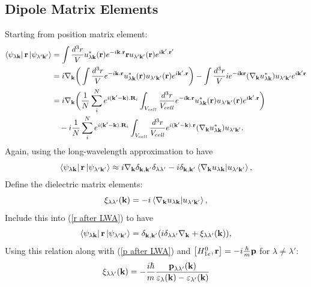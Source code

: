 \documentclass[12pt,english,a4paper]{article}
\begin{document}
\begin{appendices}
\section{Dipole Matrix Elements}
\label{Dipole Matrix Elements}
\quad Starting from position matrix element:
\begin{align}
\bra{\psi_{\lambda \textbf{k}}}\textbf{r}\ket{\psi_{\lambda'\textbf{k}'}} &= \int \frac{d^3 r}{V} u^*_{\lambda \textbf{k}}(\textbf{r}) e^{-i\textbf{k}.\textbf{r}} \textbf{r} u_{\lambda' \textbf{k}'}(\textbf{r}) e^{i\textbf{k}'.\textbf{r}'}\\
&= i \nabla_\textbf{k} \bigg(\int \frac{d^3 r}{V} e^{-i\textbf{k}.\textbf{r}}u^*_{\lambda \textbf{k}}(\textbf{r}) u_{\lambda' \textbf{k}'}(\textbf{r})e^{i\textbf{k}'.\textbf{r}}\bigg) - \int \frac{d^3 r}{V} i e^{-i\textbf{k}\textbf{r}}(\nabla_\textbf{k} u^*_{\lambda \textbf{k}}) u_{\lambda' \textbf{k}'} e^{i\textbf{k}'\textbf{r}}\nonumber\\
&= i \nabla_\textbf{k} \bigg(\frac{1}{N} \sum_{i}^N e^{i(\textbf{k}'-\textbf{k}).\textbf{R}_i}\int_{V_{cell}} \frac{d^3 r}{V_{cell}} e^{-i\textbf{k}.\textbf{r}}u^*_{\lambda \textbf{k}}(\textbf{r}) u_{\lambda' \textbf{k}'}(\textbf{r})e^{i\textbf{k}'.\textbf{r}}\bigg)\nonumber\\
&\quad  - i\frac{1}{N}\sum_{i}^N e^{i(\textbf{k}'-\textbf{k}).\textbf{R}_i} \int_{V_{cell}} \frac{d^3 r}{V_{cell}} e^{i(\textbf{k}'-\textbf{k}).\textbf{r}} (\nabla_\textbf{k} u^*_{\lambda \textbf{k}}) u_{\lambda' \textbf{k}'}.
\end{align}
\quad Again, using the long-wavelength approximation to have
\begin{equation}
	\label{r after LWA}
	\bra{\psi_{\lambda \textbf{k}}}\textbf{r}\ket{\psi_{\lambda'\textbf{k}'}} \approx i \nabla_{\textbf{k}} \delta_{\textbf{k},\textbf{k}'}\delta_{\lambda \lambda'} - i \delta_{\textbf{k},\textbf{k}'} \braket{\nabla_\textbf{k}u_{\lambda \textbf{k}}}{u_{\lambda'\textbf{k}'}},
\end{equation}
\quad Define the dielectric matrix elements:
\begin{equation}
	\xi_{\lambda\lambda'}(\textbf{k}) = - i \braket{\nabla_\textbf{k}u_{\lambda \textbf{k}}}{u_{\lambda'\textbf{k}'}},
\end{equation}
\quad Include this into (\ref{r after LWA}) to have
\begin{equation}
	\bra{\psi_{\lambda \textbf{k}}}\textbf{r}\ket{\psi_{\lambda'\textbf{k}'}} = \delta_{\textbf{k},\textbf{k}'}(i\delta_{\lambda \lambda'} \nabla_{\textbf{k}}  +  \xi_{\lambda\lambda'}(\textbf{k})),
\end{equation}
Using this relation along with (\ref{p after LWA}) and $\comm{H^0_{1e}}{\textbf{r}} = -i\frac{\hbar}{m}\textbf{p}$ for $\lambda \neq \lambda'$:
\begin{equation}
	\xi_{\lambda\lambda'}(\textbf{k}) = -\frac{i\hbar}{m}\frac{\textbf{p}_{\lambda\lambda'}(\textbf{k})}{\varepsilon_{\lambda}(\textbf{\textbf{k}}) - \varepsilon_{\lambda'}(\textbf{k})}
\end{equation}
\end{appendices}
\newpage


\end{document}
